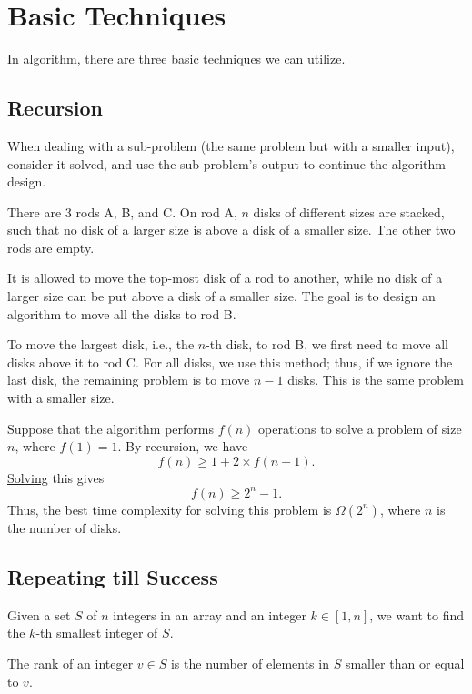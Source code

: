 \section{Basic Techniques}
In algorithm, there are three basic techniques we can utilize. 

\subsection{Recursion}
When dealing with a sub-problem (the same problem but with a smaller input), consider it solved, and use the sub-problem’s output to continue the algorithm design.

\begin{eg}
  There are 3 rods A, B, and C. On rod A, \(n\) disks of different sizes are stacked, such that no disk of a larger size is above a disk of a smaller size. The other two rods are empty. 

  It is allowed to move the top-most disk of a rod to another, while no disk of a larger size can be put above a disk of a smaller size. The goal is to design an algorithm to move all the disks to rod B.

  To move the largest disk, i.e., the \(n\)-th disk, to rod B, we first need to move all disks above it to rod C. For all disks, we use this method; thus, if we ignore the last disk, the remaining problem is to move \(n - 1\) disks. This is the same problem with a smaller size. 

  Suppose that the algorithm performs \(f(n)\) operations to solve a problem of size \(n\), where \(f(1) = 1\). By recursion, we have 
  \[
    f(n) \geq 1 + 2 \times f(n - 1).
  \]
  \href{https://www.ryanc.wtf/files/ENGG2440.pdf#page=14}{Solving} this gives 
  \[
    f(n) \geq 2^n - 1.
  \]
  Thus, the best time complexity for solving this problem is \(\Omega(2^n)\), where \(n\) is the number of disks. 
\end{eg}

\subsection{Repeating till Success}

Given a set \(S\) of \(n\) integers in an array and an integer \(k \in [1, n]\), we want to find the \(k\)-th smallest integer of \(S\). 

\begin{definition}[Rank]
    The rank of an integer \(v \in S\) is the number of elements in \(S\) smaller than or equal to \(v\). 
\end{definition}


